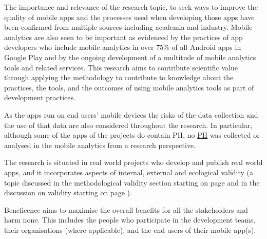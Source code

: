 

The importance and relevance of the research topic, to seek ways to improve the quality of mobile apps and the processes used when developing those apps have been confirmed from multiple sources including academia and industry. Mobile analytics are also seen to be important as evidenced by the practices of app developers who include mobile analytics in over 75\% of all Android apps in Google Play and by the ongoing development of a multitude of mobile analytics tools and related services. This research aims to contribute scientific value through applying the methodology to contribute to knowledge about the practices, the tools, and the outcomes of using mobile analytics tools as part of development practices. 

As the apps run on end users' mobile devices the risks of the data collection and the use of that data are also considered throughout the research. In particular, although some of the apps of the projects do contain PII, no \href{glossary-pii}{PII} was collected or analysed in the mobile analytics from a research perspective.

The research is situated in real world projects who develop and publish real world apps, and it incorporates aspects of internal, external and ecological validity (a topic discussed in the methodological validity section starting on page \pageref{methodology-threats-to-validity-section} and in the discussion on validity starting on page \pageref{discussion-threats-to-validity-section}).


Beneficence aims to maximise the overall benefits for all the stakeholders and harm none. This includes the people who participate in the development teams, their organisations (where applicable), and the end users of their mobile app(s).

